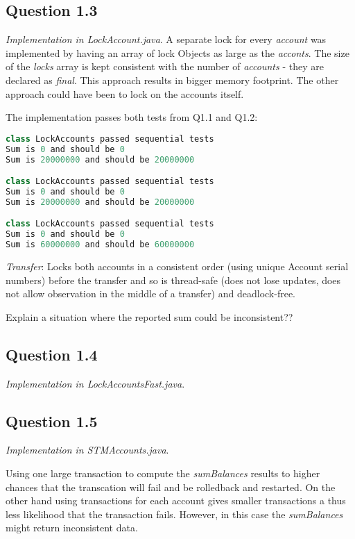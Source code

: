 \documentclass[format=acmsmall, review=false, screen=true]{acmart}
\begin{document}
\subsection{Question 1.3}

\textit{Implementation in LockAccount.java}. A separate lock for every \emph{account} was implemented by having an array of lock Objects as large as the \emph{acconts}. The size of the \emph{locks} array is kept consistent with the number of \emph{accounts} - they are declared as \emph{final}. This approach results in bigger memory footprint. The other approach could have been to lock on the accounts itself.

The implementation passes both tests from Q1.1 and Q1.2:

\begin{lstlisting}[language=java]
class LockAccounts passed sequential tests
Sum is 0 and should be 0
Sum is 20000000 and should be 20000000

class LockAccounts passed sequential tests
Sum is 0 and should be 0
Sum is 20000000 and should be 20000000

class LockAccounts passed sequential tests
Sum is 0 and should be 0
Sum is 60000000 and should be 60000000
\end{lstlisting}

\emph{Transfer}: Locks both accounts in a consistent order (using unique Account serial numbers) before the transfer and so is thread-safe (does not lose updates, does not allow observation in the middle of a transfer) and deadlock-free.

Explain a situation where the reported sum could be inconsistent??

\subsection{Question 1.4}

\textit{Implementation in LockAccountsFast.java}.

\subsection{Question 1.5}

\textit{Implementation in STMAccounts.java}.

Using one large transaction to compute the \emph{sumBalances} results to higher chances that the transcation will fail and be rolledback and restarted. On the other hand using transactions for each account gives smaller transactions a thus less likelihood that the transaction fails. However, in this case the \emph{sumBalances} might return inconsistent data.
\end{document}
